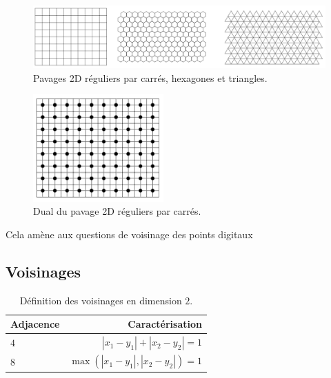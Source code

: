 \begin{figure}[ht]
  \begin{center}
    \includegraphics[width=14cm]{images/Notions/Pavages}
    \caption{Pavages 2D réguliers par carrés, hexagones et triangles.\label{fig:pavages}}
  \end{center}
\end{figure}



\begin{figure}[ht]
  \begin{center}
    \includegraphics[width=5cm]{images/Notions/Pavage_dual}
    \caption{Dual du pavage 2D réguliers par carrés.\label{fig:pavage_dual}}
  \end{center}
\end{figure}

Cela amène aux questions de voisinage des points digitaux
%
%
\subsection{Voisinages}
\label{sec:voisinage}
%

%
\begin{table}[ht]
  \centering
  \caption{Définition des voisinages en dimension $2$.}
  \label{tab:adjacence2d}
    \renewcommand{\arraystretch}{1.1}
  \begin{tabular}{@{}lr@{}}
    \toprule
    Adjacence  & Caractérisation \\ \midrule
    $4$        & $|x_1 - y_1| + |x_2 - y_2| = 1$ \\
    $8$        & $\max(|x_1 - y_1|,|x_2 - y_2|) = 1$ \\
    \bottomrule
  \end{tabular}
\end{table}

